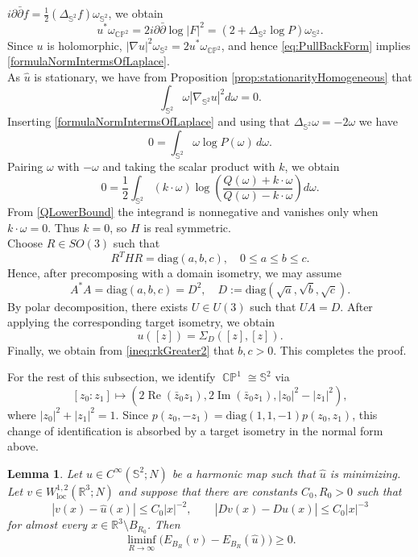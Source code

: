 \documentclass[11pt]{article}
\theoremstyle{plain}
\numberwithin{equation}{section}
\newtheorem{lemma}[theorem]{Lemma}
\theoremstyle{definition}
\let\oldendproof\endproof
\renewenvironment{proof}[1][\proofname]{%
\oldproof[\upshape \bfseries #1]%
}{\oldendproof}
\renewcommand{\Re}{\operatorname{Re}}
\renewcommand{\Im}{\operatorname{Im}}
\def \R {\mathbb{R}}
\def \p{\partial}
\def \mb{\mathbb}
\DeclareMathOperator{\CP}{\mathbb{CP}}
\begin{document}
\begin{proof}
$i\p\bar\p f=\frac12(\Delta_{\mb S^2}f)\omega_{\mb S^2}$, we obtain
\begin{equation}
    \label{eq:PullBackForm}
    u^*\omega_{\CP^2}
    =2i\p\bar\p\log|F|^2
    =(2+\Delta_{\mb S^2}\log P)\omega_{\mb S^2}.
\end{equation}
Since $u$ is holomorphic, $|\nabla u|^2\omega_{\mb S^2}=2u^*\omega_{\mathbb{CP}^2}$,
and hence \eqref{eq:PullBackForm} implies \eqref{formulaNormIntermsOfLaplace}.\\
As $\hat u$ is stationary, we have from Proposition  \ref{prop:stationarityHomogeneous} that
\[
\int_{\mb S^2}\omega |\nabla_{\mb S^2} u|^2d\omega=0.
\]
Inserting \eqref{formulaNormIntermsOfLaplace}
and using that $\Delta_{\mathbb S^2}\omega=-2\omega$ we have
\[
0=\int_{\mathbb S^2}\omega\log P(\omega)\,d\omega.
\]
Pairing $\omega$ with $-\omega$ and taking the scalar product with $k$,
we obtain
\[
0=
\frac12\int_{\mathbb S^2}
(k\cdot\omega)
\log\left(
\frac{Q(\omega)+k\cdot\omega}
     {Q(\omega)-k\cdot\omega}
\right)d\omega.
\]
From \eqref{QLowerBound} the integrand is nonnegative and vanishes only when $k \cdot \omega =0$.
Thus $k=0$, so $H$ is real symmetric.\\
Choose $R \in SO(3)$ such that
\[
R^THR=\mathrm{diag}(a,b,c),
\quad 0\le a\le b\le c.
\]
Hence, after precomposing
with a domain isometry, we may assume
\[
A^*A=\mathrm{diag}(a,b,c)=D^2,
\quad
D:=\mathrm{diag}(\sqrt a,\sqrt b,\sqrt c).
\]
By polar decomposition, there exists \(U\in U(3)\) such that \(UA=D\).
After applying the corresponding target isometry, we obtain
\[
u([z])=\Sigma_D([z],[z]).
\]
Finally, we obtain from \eqref{ineq:rkGreater2} that $b,c>0$. This completes the proof. 
\end{proof}

For the rest of this subsection, we identify $\CP^1\cong\mb S^2$ via
\[
[z_0:z_1]\mapsto(2\Re(\bar z_0z_1),2\Im(\bar z_0z_1),|z_0|^2-|z_1|^2),
\]
where $|z_0|^2+|z_1|^2=1$. Since $p(z_0,-z_1)=\mathrm{diag}(1,1,-1)p(z_0,z_1)$, this change of identification is absorbed by a target isometry in the normal form above.

\begin{lemma}
    \label{lem:AsymptoticCompetitor}
Let $u\in C^\infty(\mb S^2;N)$ be a harmonic map such that $\hat u$ is minimizing. Let \(v\in W^{1,2}_{\mathrm{loc}}(\R^3;N)\) and suppose that there are constants
\(C_0,R_0>0\) such that
\begin{equation}\label{eq:decay}
    |v(x)-\widehat u(x)|\leq C_0|x|^{-2},
    \qquad
    |Dv(x)-D\widehat u(x)|\leq C_0|x|^{-3}
\end{equation}
for almost every \(x\in \R^3\setminus B_{R_0}\). Then 
\begin{equation}
    \label{eq:liminfEqualityEnergy}
    \liminf_{R\to\infty}
    \bigl(E_{B_R}(v)-E_{B_R}(\widehat u)\bigr)\geq 0.
\end{equation}
\end{lemma}
\end{document}
